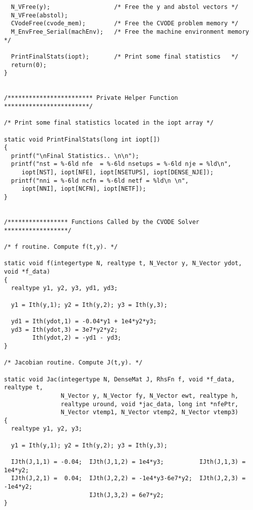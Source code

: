 \begin{verbatim}
  N_VFree(y);                  /* Free the y and abstol vectors */
  N_VFree(abstol);   
  CVodeFree(cvode_mem);        /* Free the CVODE problem memory */
  M_EnvFree_Serial(machEnv);   /* Free the machine environment memory */

  PrintFinalStats(iopt);       /* Print some final statistics   */
  return(0);
}


/************************ Private Helper Function ************************/

/* Print some final statistics located in the iopt array */

static void PrintFinalStats(long int iopt[])
{
  printf("\nFinal Statistics.. \n\n");
  printf("nst = %-6ld nfe  = %-6ld nsetups = %-6ld nje = %ld\n",
     iopt[NST], iopt[NFE], iopt[NSETUPS], iopt[DENSE_NJE]);
  printf("nni = %-6ld ncfn = %-6ld netf = %ld\n \n",
     iopt[NNI], iopt[NCFN], iopt[NETF]);
}


/***************** Functions Called by the CVODE Solver ******************/

/* f routine. Compute f(t,y). */

static void f(integertype N, realtype t, N_Vector y, N_Vector ydot, void *f_data)
{
  realtype y1, y2, y3, yd1, yd3;

  y1 = Ith(y,1); y2 = Ith(y,2); y3 = Ith(y,3);

  yd1 = Ith(ydot,1) = -0.04*y1 + 1e4*y2*y3;
  yd3 = Ith(ydot,3) = 3e7*y2*y2;
        Ith(ydot,2) = -yd1 - yd3;
}

/* Jacobian routine. Compute J(t,y). */

static void Jac(integertype N, DenseMat J, RhsFn f, void *f_data, realtype t,
                N_Vector y, N_Vector fy, N_Vector ewt, realtype h, 
                realtype uround, void *jac_data, long int *nfePtr, 
                N_Vector vtemp1, N_Vector vtemp2, N_Vector vtemp3)
{
  realtype y1, y2, y3;

  y1 = Ith(y,1); y2 = Ith(y,2); y3 = Ith(y,3);

  IJth(J,1,1) = -0.04;  IJth(J,1,2) = 1e4*y3;          IJth(J,1,3) = 1e4*y2;
  IJth(J,2,1) =  0.04;  IJth(J,2,2) = -1e4*y3-6e7*y2;  IJth(J,2,3) = -1e4*y2;
                        IJth(J,3,2) = 6e7*y2;
}
 
\end{verbatim}